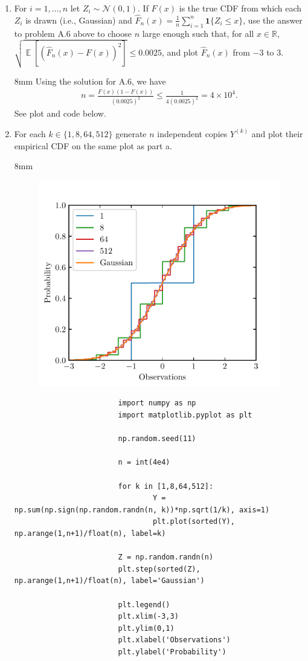 \documentclass{article}
\newcommand{\vect}[1]{\boldsymbol{#1}} %
\DeclareMathOperator{\E}{\mathbb{E}}
\newenvironment{solution}{\begin{adjustwidth}{8mm}{}}{\end{adjustwidth}}
\begin{document}
\begin{enumerate}
        \item For $i=1,\dots,n$ let $Z_i \sim \mathcal{N}(0,1)$. If $F(x)$ is the true CDF from which each $Z_i$ is drawn (i.e., Gaussian) and $\hat{F}_n(x) = \frac{1}{n} \sum_{i=1}^n \vect{1}\{Z_i \leq x\}$, use the answer to problem A.6 above to choose $n$ large enough such that, for all $x \in \mathbb{R}$, $\sqrt{\E[(\hat{F}_n(x) - F(x))^2]} \leq 0.0025$, and plot $\hat{F}_n(x)$ from $-3$ to $3$.
        \begin{solution}
                Using the solution for A.6, we have
                \begin{align*}
                        n = \frac{F(x)(1-F(x))}{(0.0025)^2} \leq \frac{1}{4(0.0025)^2} = 4 \times 10^4.
                \end{align*}
                See plot and code below.
        \end{solution}
        \item For each $k \in \{1,8,64,512\}$ generate $n$ independent copies $Y^{(k)}$ and plot their empirical CDF on the same plot as part a.
        \begin{solution}
                \begin{figure}[H]
                        \centering
                        \includegraphics[width=0.5\linewidth]{A12.pdf}
                \end{figure}
                \begin{verbatim}
                        import numpy as np
                        import matplotlib.pyplot as plt

                        np.random.seed(11)

                        n = int(4e4)

                        for k in [1,8,64,512]:
                                Y = np.sum(np.sign(np.random.randn(n, k))*np.sqrt(1/k), axis=1)
                                plt.plot(sorted(Y), np.arange(1,n+1)/float(n), label=k)
                        
                        Z = np.random.randn(n)
                        plt.step(sorted(Z), np.arange(1,n+1)/float(n), label='Gaussian')

                        plt.legend()
                        plt.xlim(-3,3)
                        plt.ylim(0,1)
                        plt.xlabel('Observations')
                        plt.ylabel('Probability')
                \end{verbatim}
        \end{solution}
\end{enumerate}
\end{document}

